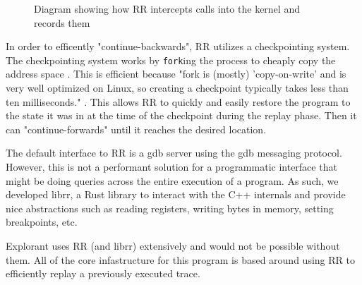 \begin{figure}
\centering
{}
\caption{Diagram showing how RR intercepts calls into the kernel and records them}
\end{figure}
    In order to efficently "continue-backwards", RR utilizes a checkpointing system. The checkpointing system works by \texttt{fork}ing the process to cheaply copy the address space \cite[p.~15]{rr}. This is efficient because "fork is (mostly) 'copy-on-write' and is very well optimized on Linux, so creating a checkpoint typically takes less than ten milliseconds." \cite[p.~15]{rr}. This allows RR to quickly and easily restore the program to the state it was in at the time of the checkpoint during the replay phase. Then it can "continue-forwards" until it reaches the desired location.

The default interface to RR is a gdb server using the gdb messaging protocol. However, this is not a performant solution for a programmatic interface that might be doing queries across the entire execution of a program. As such, we developed librr, a Rust library to interact with the C++ internals and provide nice abstractions such as reading registers, writing bytes in memory, setting breakpoints, etc. 

Explorant uses RR (and librr) extensively and would not be possible without them. All of the core infastructure for this program is based around using RR to efficiently replay a previously executed trace.  


